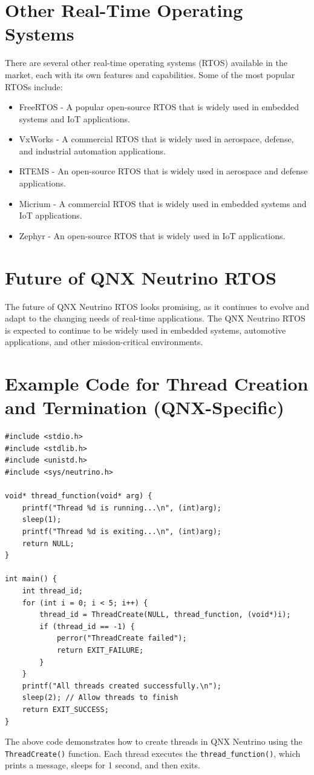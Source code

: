 \documentclass{article}
\begin{document}
\section{Other Real-Time Operating Systems}
\label{sec:other-rtos}
There are several other real-time operating systems (RTOS) available in the market, each with its own features and capabilities. Some of the most popular RTOSs include:
\begin{itemize}
    \item  FreeRTOS - A popular open-source RTOS that is widely used in embedded systems and IoT applications.
    \item  VxWorks - A commercial RTOS that is widely used in aerospace, defense, and industrial automation applications.
    \item  RTEMS - An open-source RTOS that is widely used in aerospace and defense applications.
    \item  Micrium - A commercial RTOS that is widely used in embedded systems and IoT applications.
    \item  Zephyr - An open-source RTOS that is widely used in IoT applications.
\end{itemize}
\section{Future of QNX Neutrino RTOS}
\label{sec:future-qnx}
The future of QNX Neutrino RTOS looks promising, as it continues to evolve and adapt to the changing needs of real-time applications.
The QNX Neutrino RTOS is expected to continue to be widely used in embedded systems, automotive applications, and other mission-critical environments.

\section{Example Code for Thread Creation and Termination (QNX-Specific)}
\label{sec:example-code-threadcreate}
\begin{verbatim}
#include <stdio.h>
#include <stdlib.h>
#include <unistd.h>
#include <sys/neutrino.h>

void* thread_function(void* arg) {
    printf("Thread %d is running...\n", (int)arg);
    sleep(1);
    printf("Thread %d is exiting...\n", (int)arg);
    return NULL;
}

int main() {
    int thread_id;
    for (int i = 0; i < 5; i++) {
        thread_id = ThreadCreate(NULL, thread_function, (void*)i);
        if (thread_id == -1) {
            perror("ThreadCreate failed");
            return EXIT_FAILURE;
        }
    }
    printf("All threads created successfully.\n");
    sleep(2); // Allow threads to finish
    return EXIT_SUCCESS;
}
\end{verbatim}
The above code demonstrates how to create threads in QNX Neutrino using the \texttt{ThreadCreate()} function.
Each thread executes the \texttt{thread\_function()}, which prints a message, sleeps for 1 second, and then exits.
\end{document}
